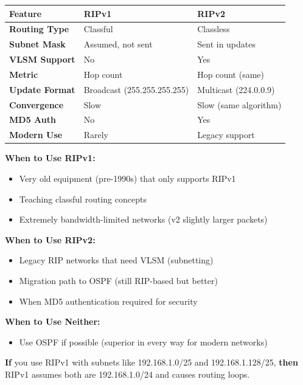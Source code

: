 \documentclass[12pt,a4paper]{article}
\begin{document}
\begin{abox}
\begin{center}
\begin{tabularx}{\textwidth}{lXX}
\toprule
\textbf{Feature} & \textbf{RIPv1} & \textbf{RIPv2} \\
\midrule
\textbf{Routing Type} & Classful & Classless \\
\textbf{Subnet Mask} & Assumed, not sent & Sent in updates \\
\textbf{VLSM Support} & No & Yes \\
\textbf{Metric} & Hop count & Hop count (same) \\
\textbf{Update Format} & Broadcast (255.255.255.255) & Multicast (224.0.0.9) \\
\textbf{Convergence} & Slow & Slow (same algorithm) \\
\textbf{MD5 Auth} & No & Yes \\
\textbf{Modern Use} & Rarely & Legacy support \\
\bottomrule
\end{tabularx}
\end{center}

\textbf{When to Use RIPv1:}
\begin{itemize}
    \item Very old equipment (pre-1990s) that only supports RIPv1
    \item Teaching classful routing concepts
    \item Extremely bandwidth-limited networks (v2 slightly larger packets)
\end{itemize}

\textbf{When to Use RIPv2:}
\begin{itemize}
    \item Legacy RIP networks that need VLSM (subnetting)
    \item Migration path to OSPF (still RIP-based but better)
    \item When MD5 authentication required for security
\end{itemize}

\textbf{When to Use Neither:}
\begin{itemize}
    \item Use OSPF if possible (superior in every way for modern networks)
\end{itemize}

\textbf{If} you use RIPv1 with subnets like 192.168.1.0/25 and 192.168.1.128/25, \textbf{then} RIPv1 assumes both are 192.168.1.0/24 and causes routing loops.
\end{abox}
\end{document}
